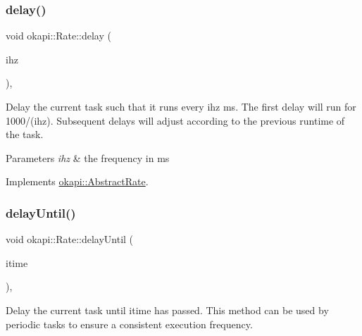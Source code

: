 \mbox{\label{classokapi_1_1Rate_a302ef2dc3cece68cd0125934c71936cc}} 
\subsubsection{\texorpdfstring{delay()}{delay()}\hspace{0.1cm}{\footnotesize\ttfamily [2/2]}}
{\footnotesize\ttfamily void okapi\+::\+Rate\+::delay (\begin{DoxyParamCaption}\item[{int}]{ihz }\end{DoxyParamCaption})\hspace{0.3cm}{\ttfamily [override]}, {\ttfamily [virtual]}}

Delay the current task such that it runs every ihz ms. The first delay will run for 1000/(ihz). Subsequent delays will adjust according to the previous runtime of the task.


\begin{DoxyParams}{Parameters}
{\em ihz} & the frequency in ms \\
\hline
\end{DoxyParams}


Implements \mbox{\hyperlink{classokapi_1_1AbstractRate_a89a4325d3fc4739abc085813095d659a}{okapi\+::\+Abstract\+Rate}}.

\mbox{\label{classokapi_1_1Rate_a9244a301c81388054954076b739cec50}} 
\subsubsection{\texorpdfstring{delayUntil()}{delayUntil()}\hspace{0.1cm}{\footnotesize\ttfamily [1/2]}}
{\footnotesize\ttfamily void okapi\+::\+Rate\+::delay\+Until (\begin{DoxyParamCaption}\item[{Q\+Time}]{itime }\end{DoxyParamCaption})\hspace{0.3cm}{\ttfamily [override]}, {\ttfamily [virtual]}}

Delay the current task until itime has passed. This method can be used by periodic tasks to ensure a consistent execution frequency.


